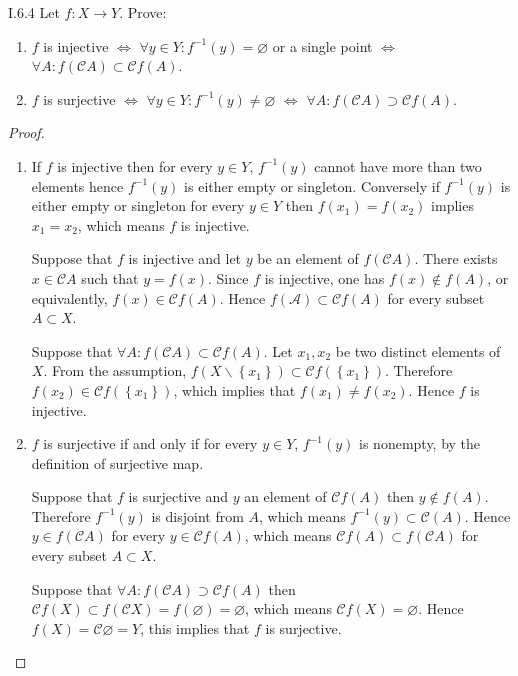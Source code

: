 \begin{problem}{I.6.4}
Let \( f: X \to Y \). Prove:
\begin{enumerate}[label={(\alph*)}]
	\item \( f \) is injective \( \iff \) \( \forall y\in Y: f^{-1}(y) = \varnothing \) or a single point \( \iff \) \( \forall A: f(\mathscr{C}A) \subset \mathscr{C}f(A) \).
	\item \( f \) is surjective \( \iff \) \( \forall y\in Y: f^{-1}(y) \ne \varnothing \) \( \iff \) \( \forall A: f(\mathscr{C}A) \supset \mathscr{C}f(A) \).
\end{enumerate}
\end{problem}

\begin{proof}
	\begin{enumerate}[label={(\alph*)}, leftmargin=*]
		\item If \( f \) is injective then for every \( y \in Y \), \( f^{-1}(y) \) cannot have more than two elements hence \( f^{-1}(y) \) is either empty or singleton. Conversely if \( f^{-1}(y) \) is either empty or singleton for every \( y \in Y \) then \( f(x_{1}) = f(x_{2}) \) implies \( x_{1} = x_{2} \), which means \( f \) is injective.

		      Suppose that \( f \) is injective and let \( y \) be an element of \( f(\mathscr{C}A) \). There exists \( x \in \mathscr{C}A \) such that \( y = f(x) \). Since \( f \) is injective, one has \( f(x) \notin f(A) \), or equivalently, \( f(x) \in \mathscr{C}f(A) \). Hence \( f(\mathscr{A}) \subset \mathscr{C}f(A) \) for every subset \( A\subset X \).

		      Suppose that \( \forall A: f(\mathscr{C}A) \subset \mathscr{C}f(A) \). Let \( x_{1}, x_{2} \) be two distinct elements of \( X \). From the assumption, \( f(X\smallsetminus \left\{ x_{1} \right\}) \subset \mathscr{C}f(\left\{ x_{1} \right\}) \). Therefore \( f(x_{2}) \in \mathscr{C}f(\left\{ x_{1} \right\}) \), which implies that \( f(x_{1}) \ne f(x_{2}) \). Hence \( f \) is injective.
		\item \( f \) is surjective if and only if for every \( y \in Y \), \( f^{-1}(y) \) is nonempty, by the definition of surjective map.

		      Suppose that \( f \) is surjective and \( y \) an element of \( \mathscr{C}f(A) \) then \( y \notin f(A) \). Therefore \( f^{-1}(y) \) is disjoint from \( A \), which means \( f^{-1}(y) \subset \mathscr{C}(A) \). Hence \( y \in f(\mathscr{C}A) \) for every \( y \in \mathscr{C}f(A) \), which means \( \mathscr{C}f(A) \subset f(\mathscr{C}A) \) for every subset \( A \subset X \).

		      Suppose that \( \forall A: f(\mathscr{C}A) \supset \mathscr{C}f(A) \) then \( \mathscr{C}f(X) \subset f(\mathscr{C}X) = f(\varnothing) = \varnothing \), which means \( \mathscr{C}f(X) = \varnothing \). Hence \( f(X) = \mathscr{C}\varnothing = Y \), this implies that \( f \) is surjective.
	\end{enumerate}
\end{proof}

